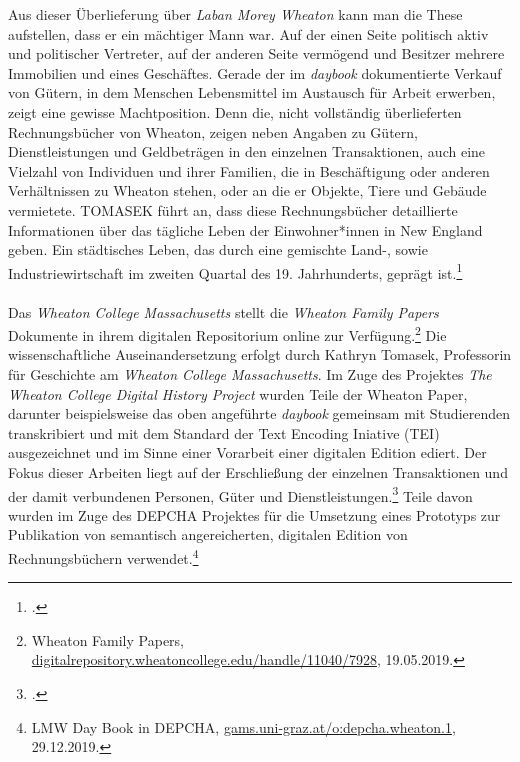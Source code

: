 \documentclass[12pt,a4paper]{article}
\begin{document}
Aus dieser Überlieferung über \textit{Laban Morey Wheaton} kann man die These aufstellen, dass er ein mächtiger Mann war. Auf der einen Seite politisch aktiv und politischer Vertreter, auf der anderen Seite vermögend und Besitzer mehrere Immobilien und eines Geschäftes. Gerade der im \textit{daybook} dokumentierte Verkauf von Gütern, in dem Menschen Lebensmittel im Austausch für Arbeit erwerben, zeigt eine gewisse Machtposition. Denn die, nicht vollständig überlieferten Rechnungsbücher von Wheaton, zeigen neben Angaben zu Gütern, Dienstleistungen und Geldbeträgen in den einzelnen Transaktionen, auch eine Vielzahl von Individuen und ihrer Familien, die in Beschäftigung oder anderen Verhältnissen zu Wheaton stehen, oder an die er Objekte, Tiere und Gebäude vermietete. TOMASEK führt an, dass diese Rechnungsbücher detaillierte Informationen über das tägliche Leben der Einwohner*innen in New England geben. Ein städtisches Leben, das durch eine gemischte Land-, sowie Industriewirtschaft im zweiten Quartal des 19. Jahrhunderts, geprägt ist.\footcite[][S.5]{tomasekmedea}
\\
\\
Das \textit{Wheaton College Massachusetts} stellt die \textit{Wheaton Family Papers} Dokumente in ihrem digitalen Repositorium online zur Verfügung.\footnote{Wheaton Family Papers, \url{digitalrepository.wheatoncollege.edu/handle/11040/7928}, 19.05.2019.} Die wissenschaftliche Auseinandersetzung erfolgt durch Kathryn Tomasek, Professorin für Geschichte am \textit{Wheaton College Massachusetts}. Im Zuge des Projektes \textit{The Wheaton College Digital History Project} wurden Teile der Wheaton Paper, darunter beispielsweise das oben angeführte \textit{daybook} gemeinsam mit Studierenden transkribiert und mit dem Standard der Text Encoding Iniative (TEI) ausgezeichnet und im Sinne einer Vorarbeit einer digitalen Edition ediert. Der Fokus dieser Arbeiten liegt auf der Erschließung der einzelnen Transaktionen und der damit verbundenen Personen, Güter und Dienstleistungen.\footcite[TOMASEK Kathryn: The Wheaton College Digital History Project: Undergraduate Research in a Local Collection, \protect\url{writinghistory.trincoll.edu/teach/wheaton-college-digital-history-project-tomasek}, 23.05.2019.][S.379]{alexander2012should} Teile davon wurden im Zuge des DEPCHA Projektes für die Umsetzung eines Prototyps zur Publikation von semantisch angereicherten, digitalen Edition von Rechnungsbüchern verwendet.\footnote{LMW Day Book in DEPCHA, \url{gams.uni-graz.at/o:depcha.wheaton.1}, 29.12.2019.}
\\
\end{document}
